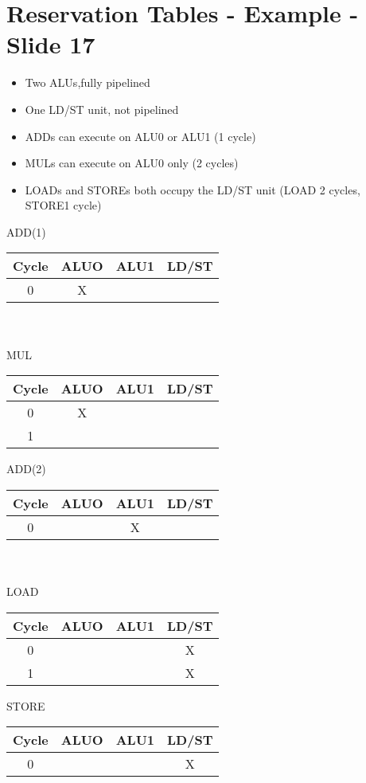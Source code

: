 \documentclass{report}
\begin{document}
\section{Reservation Tables - Example - Slide 17}
\vspace{-1em}
\begin{multicols}{2}
  \begin{itemize}
    \item Two ALUs,fully pipelined
    \item One LD/ST unit, not pipelined
    \item ADDs can execute on ALU0 or ALU1 (1 cycle)
    \item MULs can execute on ALU0 only (2 cycles)
    \item LOADs and STOREs both occupy the LD/ST unit
          (LOAD 2 cycles, STORE1 cycle)
  \end{itemize}
\end{multicols}
\vspace{-2em}
\begin{multicols}{3}
ADD(1) \\
\begin{tabular}{|c|c|c|c|}
  \hline
  Cycle & ALUO & ALU1 & LD/ST \\
  \hline
  0 & X    &      &       \\
  \hline
\end{tabular} \\ \ \\
MUL \\
\begin{tabular}{|c|c|c|c|}
  \hline
  Cycle & ALUO & ALU1 & LD/ST \\
  \hline
  0     & X    &      &       \\
  \hline
  1     &      &      &       \\
  \hline
\end{tabular}
  \vfill\columnbreak
ADD(2) \\
\begin{tabular}{|c|c|c|c|}
  \hline
  Cycle & ALUO & ALU1 & LD/ST \\
  \hline
  0     &      & X    &       \\
  \hline
\end{tabular} \\ \ \\
LOAD \\
\begin{tabular}{|c|c|c|c|}
  \hline
  Cycle & ALUO & ALU1 & LD/ST \\
  \hline
  0    &       &      & X     \\
  \hline 
  1    &       &      & X     \\
  \hline
\end{tabular}
  \vfill\columnbreak
STORE \\
\begin{tabular}{|c|c|c|c|}
  \hline
  Cycle & ALUO & ALU1 & LD/ST \\
  \hline
  0     &      &      & X     \\
  \hline
\end{tabular}
\end{multicols}
\end{document}
